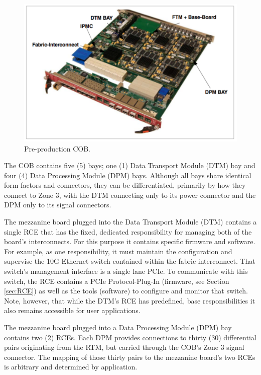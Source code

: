 \begin{figure}[tbh]
\includegraphics[scale=0.8]{cob-photo.pdf}
\caption{Pre-production COB.  }
\label{fig:cob}
\end{figure} 

The COB contains five (5) bays; one (1) Data Transport Module (DTM) bay 
and four (4) Data Processing Module (DPM) bays. 
Although all bays share identical form factors and connectors, 
they can be differentiated, primarily by how they connect to Zone 3,
with the DTM connecting only to its power connector and the DPM 
only to its signal connectors.

The mezzanine board plugged into the Data Transport Module (DTM) 
contains a single RCE that has the fixed, dedicated responsibility for 
managing both of the board's interconnects. 
For this purpose it contains specific firmware and software. 
For example, as one responsibility, it must maintain the 
configuration and supervise the 10G-Ethernet switch contained 
within the fabric interconnect. 
That switch's management interface is a single lane PCIe. 
To communicate with this switch, the RCE contains a 
PCIe Protocol-Plug-In (firmware, see Section \ref{sec:RCE}) 
as well as the tools (software) to configure and monitor that switch. 
Note, however, that while the DTM's RCE has predefined, base 
responsibilities it also remains accessible for user applications.

The mezzanine board plugged into a Data Processing Module (DPM)
bay contains two (2) RCEs. 
Each DPM provides connections to thirty 
(30) differential pairs originating from the RTM, 
but carried through the COB's Zone 3 signal connector. 
The mapping of those thirty pairs to the mezzanine board's 
two RCEs is arbitrary and determined by application. 

